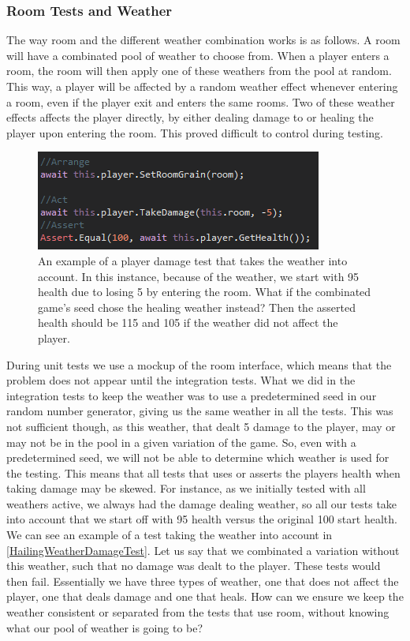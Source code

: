 \subsubsection{Room Tests and Weather}
The way room and the different weather combination works is as follows. A room will have a combinated pool of weather to choose from. When a player enters a room, the room will then apply one of these weathers from the pool at random. This way, a player will be affected by a random weather effect whenever entering a room, even if the player exit and enters the same rooms. Two of these weather effects affects the player directly, by either dealing damage to or healing the player upon entering the room. This proved difficult to control during testing. \\
\begin{figure}[h]
    \centering
    \includegraphics[width=0.5\linewidth]{Materials/TestingDiscussion/HailingWeatherDamageTest}
    \caption{An example of a player damage test that takes the weather into account. In this instance, because of the weather, we start with 95 health due to losing 5 by entering the room. What if the combinated game's seed chose the healing weather instead? Then the asserted health should be 115 and 105 if the weather did not affect the player.}
    \label{HailingWeatherDamageTest}
\end{figure}
During unit tests we use a mockup of the room interface, which means that the problem does not appear until the integration tests. What we did in the integration tests to keep the weather was to use a predetermined seed in our random number generator, giving us the same weather in all the tests. This was not sufficient though, as this weather, that dealt 5 damage to the player, may or may not be in the pool in a given variation of the game. So, even with a predetermined seed, we will not be able to determine which weather is used for the testing. This means that all tests that uses or asserts the players health when taking damage may be skewed. For instance, as we initially tested with all weathers active, we always had the damage dealing weather, so all our tests take into account that we start off with 95 health versus the original 100 start health. We can see an example of a test taking the weather into account in \autoref{HailingWeatherDamageTest}. Let us say that we combinated a variation without this weather, such that no damage was dealt to the player. These tests would then fail. Essentially we have three types of weather, one that does not affect the player, one that deals damage and one that heals. How can we ensure we keep the weather consistent or separated from the tests that use room, without knowing what our pool of weather is going to be? 
